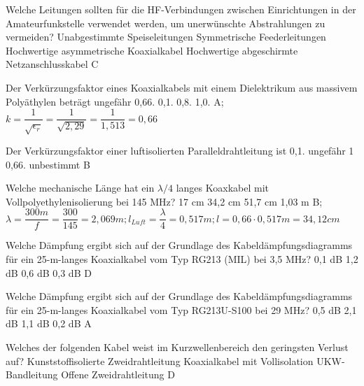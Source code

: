{Welche Leitungen sollten für die HF-Verbindungen zwischen Einrichtungen in der Amateurfunkstelle verwendet werden, um unerwünschte Abstrahlungen zu vermeiden?}%
{Unabgestimmte Speiseleitungen}%
{Symmetrische Feederleitungen}%
{Hochwertige asymmetrische Koaxialkabel}%
{Hochwertige abgeschirmte Netzanschlusskabel}%
{C}%

{Der Verkürzungsfaktor eines Koaxialkabels mit einem Dielektrikum aus massivem Polyäthylen beträgt ungefähr}%
{0,66.}%
{0,1.}%
{0,8.}%
{1,0.}%
{A; $k=\dfrac{1}{\sqrt{\epsilon_r}} = \dfrac{1}{\sqrt{2,29}} = \dfrac{1}{1,513} = 0,66  $}%

{Der Verkürzungsfaktor einer luftisolierten Paralleldrahtleitung ist}%
{0,1.}%
{ungefähr 1}%
{0,66.}%
{unbestimmt}%
{B}%

{Welche mechanische Länge hat ein $\lambda/4$ langes Koaxkabel mit Vollpolyethylenisolierung bei 145 MHz?}%
{17 cm}%
{34,2 cm}%
{51,7 cm}%
{1,03 m}%
{B; $ 
\lambda = \dfrac{300m}{f} = \dfrac{300}{145} = 2,069m; 
l_{Luft} = \dfrac{ \lambda }{4}=0,517m; 
l= 0,66 \cdot 0,517m = 34,12 cm $}%

{Welche Dämpfung ergibt sich auf der Grundlage des Kabeldämpfungsdiagramms für ein 25-m-langes Koaxialkabel vom Typ RG213 (MIL) bei 3,5 MHz?}%
{0,1 dB}%
{1,2 dB}%
{0,6 dB}%
{0,3 dB}%
{D}%

{Welche Dämpfung ergibt sich auf der Grundlage des Kabeldämpfungsdiagramms für ein 25-m-langes Koaxialkabel vom Typ RG213U-S100 bei 29 MHz?}%
{0,5 dB}%
{2,1 dB}%
{1,1 dB}%
{0,2 dB}%
{A}%

{Welches der folgenden Kabel weist im Kurzwellenbereich den geringsten Verlust auf?}%
{Kunststoffisolierte Zweidrahtleitung}%
{Koaxialkabel mit Vollisolation}%
{UKW-Bandleitung}%
{Offene Zweidrahtleitung}%
{D}%